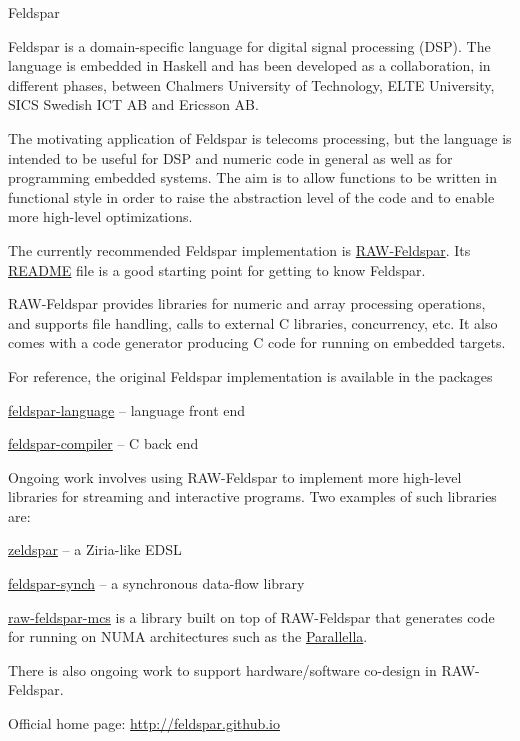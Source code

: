 \begin{hcarentry}[updated]{Feldspar}
\label{feldspar}
\makeheader

Feldspar is a domain-specific language for digital signal processing (DSP). The
language is embedded in Haskell and has been developed as a collaboration, in
different phases, between Chalmers University of Technology, ELTE University,
SICS Swedish ICT AB and Ericsson AB.

The motivating application of Feldspar is telecoms processing, but the language
is intended to be useful for DSP and numeric code in general as well as for
programming embedded systems. The aim is to allow functions to be written in
functional style in order to raise the abstraction level of the code and to
enable more high-level optimizations.

The currently recommended Feldspar implementation is
\mbox{\href{http://hackage.haskell.org/package/raw-feldspar}{RAW-Feldspar}}.
Its
\mbox{\href{https://github.com/Feldspar/raw-feldspar/blob/master/README.md}{README}}
file is a good starting point for getting to know Feldspar.

RAW-Feldspar provides libraries for numeric and array processing operations, and
supports file handling, calls to external C libraries, concurrency, etc. It also
comes with a code generator producing C code for running on embedded targets.

For reference, the original Feldspar implementation is available in the packages
\begin{compactitem}
\item \href{http://hackage.haskell.org/package/feldspar-language}{feldspar-language} -- language front end
\item \href{http://hackage.haskell.org/package/feldspar-compiler}{feldspar-compiler} -- C back end
\end{compactitem}

Ongoing work involves using RAW-Feldspar to implement more high-level libraries
for streaming and interactive programs. Two examples of such libraries are:

\begin{compactitem}
\item \href{https://github.com/koengit/zeldspar}{zeldspar} -- a Ziria-like EDSL
\item \href{https://github.com/emilaxelsson/feldspar-synch}{feldspar-synch} -- a synchronous data-flow library
\end{compactitem}

\href{https://github.com/kmate/raw-feldspar-mcs}{raw-feldspar-mcs} is a
library built on top of RAW-Feldspar that generates code for running on NUMA
architectures such as the \href{http://www.parallella.org}{Parallella}.

There is also ongoing work to support hardware/software co-design in
RAW-Feldspar.

\FurtherReading
\begin{compactitem}
\item Official home page: \url{http://feldspar.github.io}
\end{compactitem}
\end{hcarentry}
